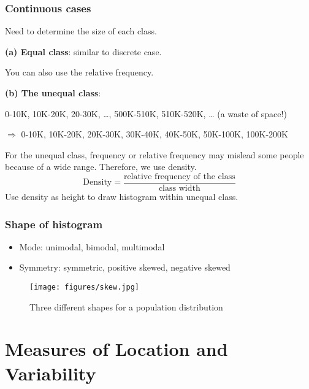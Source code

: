 \subsubsection{Continuous cases}
Need to determine the size of each class.

\textbf{(a) Equal class}: similar to discrete case.

\begin{figure}[H]
\centering
{}
\end{figure}


You can also use the relative frequency.


\textbf{(b) The unequal class}:
\begin{exmp}
  0-10K, 10K-20K, 20-30K, \dots, 500K-510K, 510K-520K, \dots 
  (a waste of space!) 
  
  $\Rightarrow $  0-10K, 10K-20K, 20K-30K, 30K-40K, 40K-50K,  50K-100K, 100K-200K
\end{exmp}
For the unequal class, frequency or relative frequency may mislead some people because of a wide range. Therefore, we use density.
\[ \text{Density} = \frac{\text{relative frequency of the class}}{\text{class width}}
\]
Use density as height to draw histogram within unequal class.
\subsubsection{Shape of histogram}
\begin{itemize}
  \item Mode: unimodal, bimodal, multimodal
  \item Symmetry: symmetric, positive skewed, negative skewed
\end{itemize}

\begin{figure}[H]
\centering
\texttt{[image: figures/skew.jpg]}
\caption{Three different shapes for a population distribution}
\label{fig:2}
\end{figure}

\section{Measures of Location and Variability}
